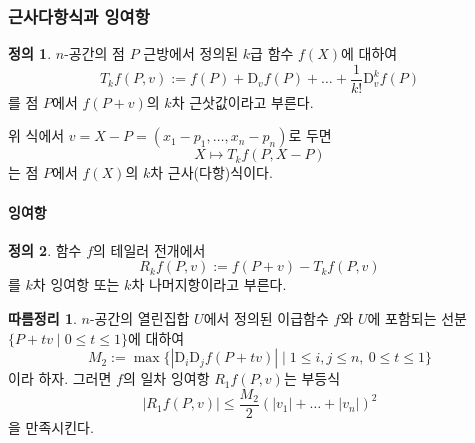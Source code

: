 \documentclass[unfonts,oneside,a4paper]{oblivoir}
\theoremstyle{definition}
\newtheorem{definition}{정의}[subsubsection]
\theoremstyle{theorem}
\newtheorem{corollary}{따름정리}[subsubsection]
\renewcommand{\vec}[1]{\bm{\mathit{#1}}}
\newcommand{\dD}{\mathrm{D}}
\begin{document}
\subsubsection{근사다항식과 잉여항}

\begin{definition}
    $n$-공간의 점 $P$ 근방에서 정의된 $k$급 함수 $f(X)$에 대하여
    \begin{equation*}
        T_k f(P, \vec v) := f(P) + \dD_{\vec v}f(P) + \dots + \frac{1}{k!} \dD_{\vec v}^k f(P)
    \end{equation*}
    를 점 $P$에서 $f(P + \vec v)$의 $k$차 근삿값이라고 부른다.
\end{definition}

위 식에서 $\vec v = X - P = (x_1 - p_1, \dots, x_n - p_n)$로 두면
\begin{equation*}
    X \mapsto T_k f(P, X - P)
\end{equation*}
는 점 $P$에서 $f(X)$의 $k$차 근사(다항)식이다.

\paragraph{잉여항}
\begin{definition}
    함수 $f$의 테일러 전개에서
    \begin{equation*}
        R_k f(P, \vec v) := f(P + \vec v) - T_k f(P, \vec v)
    \end{equation*}
    를 $k$차 잉여항 또는 $k$차 나머지항이라고 부른다.
\end{definition}

\begin{corollary} \label{cor:residue}
    $n$-공간의 열린집합 $U$에서 정의된 이급함수 $f$와 $U$에 포함되는 선분 $\{P + t \vec v \mid 0 \leq t \leq 1\}$에 대하여
    \begin{equation*}
        M_2 := \max \{|\dD_i \dD_j f(P + t \vec v)| \mid 1 \leq i, j \leq n,\ 0 \leq t \leq 1\}
    \end{equation*}
    이라 하자.
    그러면 $f$의 일차 잉여항 $R_1 f(P, \vec v)$는 부등식
    \begin{equation*}
        |R_1 f(P, \vec v)| \leq \frac{M_2}{2} (|v_1| + \dots + |v_n|)^2
    \end{equation*}
    을 만족시킨다.
\end{corollary}
\end{document}
